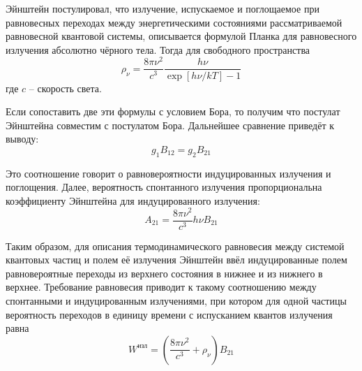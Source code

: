 Эйнштейн постулировал, что излучение, испускаемое и поглощаемое при 
равновесных переходах между энергетическими состояниями рассматриваемой 
равновесной квантовой системы, описывается формулой Планка для 
равновесного излучения абсолютно чёрного тела. Тогда для свободного 
пространства
\[
	\rho_\nu = \frac{8\pi\nu^2}{c^3}\frac{h\nu}{\exp[h\nu/kT] - 1}
\]
где \( c \) -- скорость света.

Если сопоставить две эти формулы с условием Бора, то получим что 
постулат Эйнштейна совместим с постулатом Бора. Дальнейшее сравнение приведёт 
к выводу:
\[
	g_1 B_{12} = g_2 B_{21}
\]

Это соотношение говорит о равновероятности индуцированных излучения и 
поглощения. Далее, вероятность спонтанного излучения пропорциональна 
коэффициенту Эйнштейна для индуцированного излучения:
\[
	A_{21} = \frac{8\pi\nu^2}{c^3}h\nu B_{21}
\]

Таким образом, для описания термодинамического равновесия между системой 
квантовых частиц и полем её излучения Эйнштейн ввёл индуцированные полем 
равновероятные переходы из верхнего состояния в нижнее и из нижнего в верхнее. 
Требование равновесия приводит к такому соотношению между спонтанными и 
индуцированным излучениями, при котором для одной частицы вероятность 
переходов в единицу времени с испусканием квантов излучения равна
\[
	W^\text{изл} = \left( \frac{8\pi\nu^2}{c^3} + \rho_\nu \right)B_{21}
\]